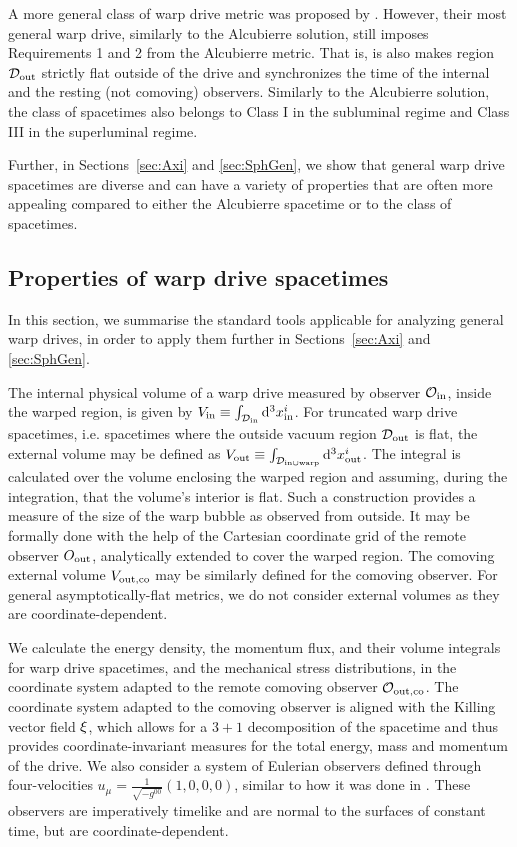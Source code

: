 \documentclass[10pt]{iopart}
\begin{document}
A more general class of warp drive metric was proposed by \cite{Natario2002}. However, their most general warp drive, similarly to the Alcubierre solution, still imposes Requirements 1 and 2 from the Alcubierre metric. That is, is also makes region $\mathcal{D}_{\rm out}$ strictly flat outside of the drive and synchronizes the time of the internal and the resting (not comoving) observers. Similarly to the Alcubierre solution, the \cite{Natario2002} class of spacetimes also belongs to Class I in the subluminal regime and Class III in the superluminal regime.

Further, in Sections~\ref{sec:Axi} and \ref{sec:SphGen}, we show that general warp drive spacetimes are diverse and can have a variety of properties that are often more appealing compared to either the Alcubierre spacetime or to the \cite{Natario2002} class of spacetimes.

\subsection{Properties of warp drive spacetimes}
\label{sec:DriveProps}

In this section, we summarise the standard tools applicable for analyzing general warp drives, in order to apply them further in Sections~\ref{sec:Axi} and \ref{sec:SphGen}.


The internal physical volume of a warp drive measured by observer $\mathcal{O}_{\rm in}$, inside the warped region, is given by $V_{\rm in}\equiv\int_{\mathcal{D}_{\rm in}}{\rm d}^3x^i_{\rm in}$. For truncated warp drive spacetimes, i.e. spacetimes where the outside vacuum region $\mathcal{D}_{\rm out}$ is flat, the external volume may be defined as $V_{\rm out}\equiv\int_{\mathcal{D}_{\rm in \cup warp}}{\rm d}^3x^i_{\rm out}$. The integral is calculated over the volume enclosing the warped region and assuming, during the integration, that the volume's interior is flat. Such a construction provides a measure of the size of the warp bubble as observed from outside. It may be formally done with the help of the Cartesian coordinate grid of the remote observer $O_{\rm out}$, analytically extended to cover the warped region. The comoving external volume $V_{\rm out, co}$ may be similarly defined for the comoving observer. For general asymptotically-flat metrics, we do not consider external volumes as they are coordinate-dependent.


We calculate the energy density, the momentum flux, and their volume integrals for warp drive spacetimes, and the mechanical stress distributions, in the coordinate system adapted to the remote comoving observer ${\mathcal{O}}_{\rm out, co}$. The coordinate system adapted to the comoving observer is aligned with the Killing vector field ${\bf \xi}$, which allows for a $3+1$ decomposition of the spacetime and thus provides coordinate-invariant measures for the total energy, mass and momentum of the drive. We also consider a system of Eulerian observers defined through four-velocities $u_{\mu}=\frac{1}{\sqrt{-g^{00}}}(1,0,0,0)$, similar to how it was done in \cite{Alcubierre1994}. These observers are imperatively timelike and are normal to the surfaces of constant time, but are coordinate-dependent.
\end{document}
